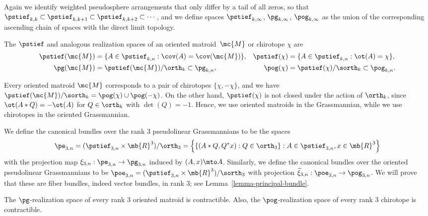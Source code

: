 Again we identify weighted pseudosphere arrangements that only differ by a tail of all zeros, so that $\pstief_{k,k} \subset \pstief_{k,k+1} \subset \pstief_{k,k+2} \subset \cdots$, and we define spaces $\pstief_{k,\infty}$, $\pg_{k,\infty}$, $\pog_{k,\infty}$ as the union of the corresponding ascending chain of spaces with the direct limit topology.

The $\pstief$ and analogous realization spaces of an oriented matroid~$\mc{M}$ or chirotope $\chi$ are
\begin{align*}
\pstief(\mc{M}) &=\{ A \in \pstief_{k,n}:\cov (A) = \cov(\mc{M})\}, &
\pstief(\chi) &=\{ A \in \pstief_{k,n}:\ot (A) = \chi\}, \\
\pg(\mc{M}) &= \pstief(\mc{M})/\orth_k \subset \pg_{k,n}, &
\pog(\chi) &= \pstief(\chi)/\sorth_k \subset \pog_{k,n}.
\end{align*}

\begin{remark}
Every oriented matroid $\mc{M}$ corresponds to a pair of chirotopes $\{\chi,-\chi\}$, and we have $\pstief(\mc{M})/\sorth_k = \pog(\chi) \cup \pog(-\chi)$.
On the other hand, $\pstief(\chi)$ is not closed under the action of $\orth_k$, since $\ot(A*Q) = -\ot(A)$ for $Q \in \orth_k$ with $\det(Q) = -1$.
Hence, we use oriented matroids in the Grassmannian, while we use chirotopes in the oriented Grassmannian.
\end{remark}

We define the canonical bundles over the rank $3$ pseudolinear Grassmannians to be the spaces
\[ \pe_{3,n} = (\pstief_{3,n} \times \mb{R}^3)/{\orth_3} = \left\{ \{(A*Q, Q^* x) : Q \in \orth_3 \} : A \in \pstief_{3,n}, x \in \mb{R}^3 \right\} \]
with the projection map $ \xi_{3,n}: \pe_{3,n} \to \pg_{3,n} $ induced by $(A,x) \mto A$.
Similarly, we define the canonical bundles over the oriented pseudolinear Grassmannians to be
$\poe_{3,n} = (\pstief_{3,n} \times \mb{R}^3)/{\sorth_3}$ with projection $ \widetilde\xi_{3,n}: \poe_{3,n} \to \pog_{3,n} $.
We will prove that these are fiber bundles, indeed vector bundles, in rank 3; see Lemma~\ref{lemma-principal-bundle}.

\label{subsection-main-theorems}

\begin{theorem}\label{theorem-pseudoreal-contract}
The $\pg$-realization space of every rank $3$ oriented matroid is contractible.
Also, the $\pog$-realization space of every rank $3$ chirotope is contractible.
\end{theorem}


